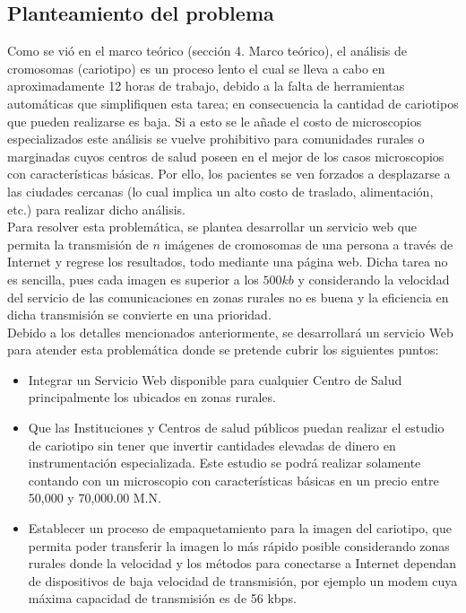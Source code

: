 \documentclass[12pt,letterpaper,titlepage]{article}
\begin{document}
\begin{itemize}
\section{Planteamiento del problema}\label{planteamientoproblema}


Como se vió en el marco teórico (sección 4. Marco teórico), el análisis de cromosomas (cariotipo) es un proceso lento el cual se lleva a cabo en aproximadamente 12 horas de trabajo, debido a la falta de herramientas automáticas que simplifiquen esta tarea; en consecuencia la cantidad de cariotipos que pueden realizarse es baja. Si a esto se le añade el costo de microscopios especializados este análisis se vuelve prohibitivo para comunidades rurales o marginadas cuyos centros de salud poseen en el mejor de los casos microscopios con características básicas. Por ello, los pacientes se ven forzados a desplazarse a las ciudades cercanas (lo cual implica un alto costo de traslado, alimentación, etc.) para realizar dicho análisis.\\

Para resolver esta problemática, se plantea desarrollar un servicio web que permita la transmisión de $n$ imágenes de cromosomas de una persona a través de Internet y regrese los resultados, todo mediante una página web. Dicha tarea no es sencilla, pues cada imagen es superior a los $500kb$ y considerando la velocidad del servicio de las comunicaciones en zonas rurales no es buena y la eficiencia en dicha transmisión se convierte en una prioridad.\\

Debido a los detalles mencionados anteriormente, se desarrollará un servicio Web para atender esta problemática donde se pretende cubrir los siguientes puntos:\\


\begin{itemize}  %
\item  Integrar un Servicio Web disponible para cualquier Centro de Salud principalmente los ubicados en zonas rurales.
\item  Que las Instituciones y Centros de salud públicos puedan realizar el estudio de cariotipo sin tener que invertir cantidades elevadas de dinero en instrumentación especializada. Este estudio se podrá realizar solamente contando con un microscopio con características básicas en un precio entre 50,000 y 70,000.00 M.N.
\item  Establecer un proceso de empaquetamiento para la imagen del cariotipo, que permita poder transferir la imagen lo más rápido posible considerando zonas rurales donde la velocidad y los métodos para conectarse a Internet dependan de dispositivos de baja velocidad de transmisión, por ejemplo un modem cuya máxima capacidad de transmisión es de 56 kbps.
\end{itemize}



\end{itemize}
\end{document}
